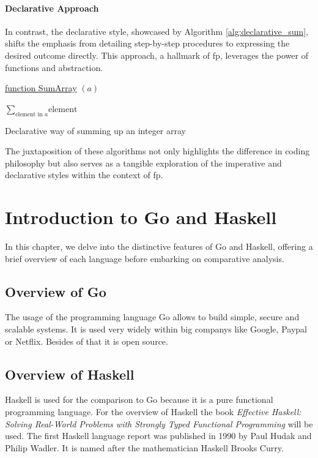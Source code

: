 \subsubsection{Declarative Approach}

In contrast, the declarative style, showcased by Algorithm \ref{alg:declarative_sum}, shifts the emphasis from detailing step-by-step procedures to expressing the desired outcome directly. This approach, a hallmark of \ac{fp}, leverages the power of functions and abstraction.

\begin{algorithm}

    \underline{function SumArray} $(a)$\;
    
    \BlankLine
    \Return $\sum_{\text{element in } a} \text{element}$
    
    \caption{Declarative way of summing up an integer array}
    \label{alg:declarative_sum}
\end{algorithm}

The juxtaposition of these algorithms not only highlights the difference in coding philosophy but also serves as a tangible exploration of the imperative and declarative styles within the context of \ac{fp}.


\chapter{Introduction to Go and Haskell}\label{chap:language-comparison}
In this chapter, we delve into the distinctive features of Go and Haskell, offering a brief overview of each language before embarking on comparative analysis.

    \section{Overview of Go}\label{sec:go-overview}
    The usage of the programming language Go allows to build simple, secure and scalable systems. It is used very widely within big companys like Google, Paypal or Netflix. Besides of that it is open source. \cite{GoWebsite}
    \section{Overview of Haskell}\label{sec:haskell-overview}
    Haskell is used for the comparison to Go because it is a pure functional programming language.
    For the overview of Haskell the book \textit{Effective Haskell: Solving Real-World Problems with Strongly Typed Functional Programming} \cite{Skinner} will be used.
    The first Haskell language report was published in 1990 by Paul Hudak and Philip Wadler. It is named after the mathematician Haskell Brooks Curry.\cite{Hudak2007}


